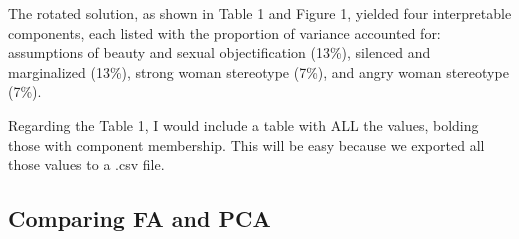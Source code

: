 \documentclass[
  english,
]{book}
\begin{document}
The rotated solution, as shown in Table 1 and Figure 1, yielded four interpretable components, each listed with the proportion of variance accounted for: assumptions of beauty and sexual objectification (13\%), silenced and marginalized (13\%), strong woman stereotype (7\%), and angry woman stereotype (7\%).

Regarding the Table 1, I would include a table with ALL the values, bolding those with component membership. This will be easy because we exported all those values to a .csv file.

\hypertarget{comparing-fa-and-pca}{%
\subsection{Comparing FA and PCA}\label{comparing-fa-and-pca}}
\end{document}
